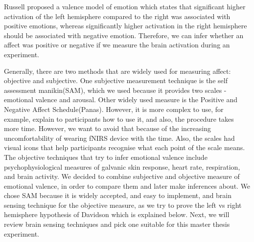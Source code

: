\documentclass[a4paper]{report}
\begin{document}
		Russell\cite{russell2003core} proposed a valence model of emotion which states that significant higher activation of the left hemisphere compared to the right was associated with positive emotions, whereas significantly higher activation in the right hemisphere should be associated with negative emotion. Therefore, we can infer whether an affect was positive or negative if we measure the brain activation during an experiment.
		
		Generally, there are two methods that are widely used for measuring affect: objective and subjective. One subjective measurement technique is the self assessment manikin(SAM)\cite{bradley1994measuring}, which we used because it provides two scales - emotional valence and arousal. Other widely used measure is the Positive and Negative Affect Schedule(Panas)\cite{watson1988development}. However, it is more complex to use, for example, explain to participants how to use it, and also, the procedure takes more time. However, we want to avoid that because of the increasing uncomfortability of wearing fNIRS device with the time. Also, the scales had visual icons that help participants recognise what each point of the scale means. The objective techniques that try to infer emotional valence include psychophysiological measures of galvanic skin response, heart rate, respiration\cite{krumhansl1997exploratory}, and brain activity\cite{Balconi201567}. We decided to combine subjective and objective measure of emotional valence, in order to compare them and later make inferences about. We chose SAM because it is widely accepted, and easy to implement, and brain sensing technique for the objective measure, as we try to prove the left vs right hemisphere hypothesis of Davidson\cite{davidson1992emotion} which is explained below. Next, we will review brain sensing techniques and pick one suitable for this master thesis experiment.
		
		
\end{document}
